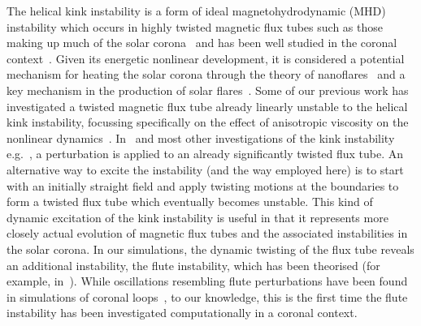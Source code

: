 \documentclass[fleqn,usenatbib]{mnras}
\begin{document}
The helical kink instability is a form of ideal magnetohydrodynamic
(MHD) instability which occurs in highly twisted magnetic flux tubes
such as those making up much of the solar
corona~\citep{realeCoronalLoopsObservations2014} and has been well
studied in the coronal
context~\citep{hoodKinkInstabilitySolar1979,hoodCoronalHeatingMagnetic2009,browningSolarCoronalHeating2003b,barefordShockHeatingNumerical2015,quinnEffectAnisotropicViscosity2020}. Given
its energetic nonlinear development, it is considered a potential
mechanism for heating the solar corona through the theory of
nanoflares~\citep{klimchukSolvingCoronalHeating2006,browningMechanismsSolarCoronal1991}
and a key mechanism in the production of solar
flares~\citep{hoodKinkInstabilitySolar1979}. Some of our previous work has investigated a twisted magnetic flux tube already linearly
unstable to the helical kink instability, focussing specifically on
the effect of anisotropic viscosity on the nonlinear
dynamics~\citep{quinnEffectAnisotropicViscosity2020}. In~\citet{quinnEffectAnisotropicViscosity2020}
and most other investigations of the kink instability
e.g.~\citet{hoodCoronalHeatingMagnetic2009}, a perturbation 
is applied to an already significantly twisted flux tube. An
alternative way to excite the instability (and the way employed here)
is to start with an initially straight field and apply twisting
motions at the boundaries to form a twisted flux tube which eventually
becomes unstable. This kind of dynamic excitation of the kink
instability is useful in that it represents more closely actual evolution of magnetic flux tubes and the associated instabilities in 
the solar corona. In our simulations, the
dynamic twisting of the flux tube reveals an additional instability,
the flute instability, which has been theorised (for example,
in~\citet{priestMagnetohydrodynamicsSun2013}). While oscillations resembling flute perturbations have been found in simulations of coronal loops~\citep{terradasEffectMagneticTwist2018}, to our knowledge, this is the first time the flute instability has been investigated computationally in a coronal context.
\end{document}
